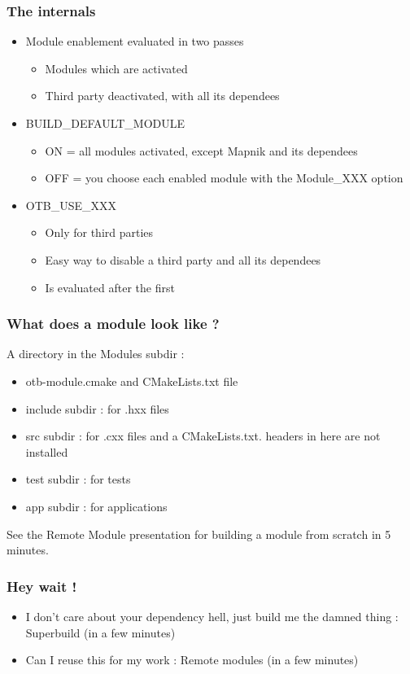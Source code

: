 \documentclass[8pt]{beamer}
\begin{document}
\begin{frame}
\frametitle{The internals}

\begin{itemize}
\item Module enablement evaluated in two passes
\begin{itemize}
\item Modules which are activated
\item Third party deactivated, with all its dependees 
\end{itemize}
\end{itemize}


\begin{itemize}
\item BUILD\_DEFAULT\_MODULE
\begin{itemize}
\item ON = all modules activated, except Mapnik and its dependees
\item OFF = you choose each enabled module with the Module\_XXX option
\end{itemize}

\item OTB\_USE\_XXX 
\begin{itemize}
\item Only for third parties
\item Easy way to disable a third party and all its dependees
\item Is evaluated after the first
\end{itemize}

\end{itemize}
\end{frame}


\begin{frame}
\frametitle{What does a module look like ?}
A directory in the Modules subdir :
\begin{itemize}
\item otb-module.cmake and CMakeLists.txt file
\item include subdir : for .hxx files
\item src subdir : for .cxx files and a CMakeLists.txt. headers in here are not installed
\item test subdir : for tests
\item app subdir : for applications
\end{itemize}

See the Remote Module presentation for building a module from scratch in 5 minutes.
\end{frame}


\begin{frame}
\frametitle{Hey wait !}
\begin{itemize}
\item I don't care about your dependency hell, just build me the damned thing : Superbuild (in a few minutes)
\item Can I reuse this for my work : Remote modules  (in a few minutes)
\end{itemize}
\end{frame}
\end{document}
